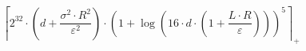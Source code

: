 \[\left\lceil 2^{32} \cdot \left(d + \frac{\sigma^{2} \cdot R^{2}}{\varepsilon^{2}}\right) \cdot \left(1 + \log\left(16 \cdot d \cdot \left(1 + \frac{L \cdot R}{\varepsilon}\right)\right)\right)^{5} \right\rceil_{+}\]
